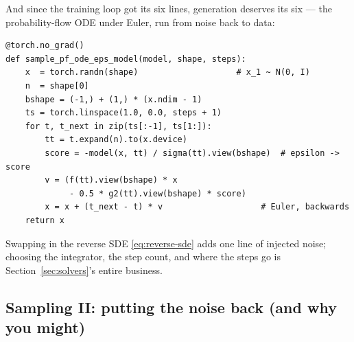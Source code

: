 \documentclass[10pt,a4paper]{article}
\begin{document}
And since the training loop got its six lines, generation deserves its
six --- the probability-flow ODE under Euler, run from noise back to
data:
\begin{lstlisting}
@torch.no_grad()
def sample_pf_ode_eps_model(model, shape, steps):
    x  = torch.randn(shape)                    # x_1 ~ N(0, I)
    n  = shape[0]
    bshape = (-1,) + (1,) * (x.ndim - 1)
    ts = torch.linspace(1.0, 0.0, steps + 1)
    for t, t_next in zip(ts[:-1], ts[1:]):
        tt = t.expand(n).to(x.device)
        score = -model(x, tt) / sigma(tt).view(bshape)  # epsilon -> score
        v = (f(tt).view(bshape) * x
             - 0.5 * g2(tt).view(bshape) * score)
        x = x + (t_next - t) * v                    # Euler, backwards
    return x
\end{lstlisting}
Swapping in the reverse SDE \eqref{eq:reverse-sde} adds one line of
injected noise; choosing the integrator, the step count, and where the
steps go is Section~\ref{sec:solvers}'s entire business.

\subsection{Sampling II: putting the noise back (and why you might)}
\end{document}
